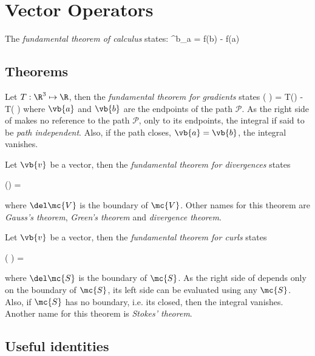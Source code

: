 \documentclass[oneside, 12pt]{book}
\begin{document}
\chapter{Vector Operators} \edef\VectorOperatorsChapter{\thechapter}

The \textit{fundamental theorem of calculus} states:
\beq[eq:ftofcalc]\int^b_a  = f(b) - f(a)\eeq

\section{Theorems}

Let \(T:\R^3 \mapsto \R\), then the \textit{fundamental theorem for gradients} states
\beq[eq:ftforgrads]  \left( \right)\cdot {} = T\left(\right) - T\left( \right)\eeq
where \(\vb{a}\) and \(\vb{b}\) are the endpoints of the path \(\mathcal{P}\). As the right side of  makes no reference to the path \(\mathcal{P}\), only to its endpoints, the integral if said to be \textit{path independent}. Also, if the path closes, \(\vb{a} = \vb{b}\), the integral vanishes.\par 

Let \(\vb{v}\) be a vector, then the \textit{fundamental theorem for divergences} states 

\beq[eq:ftfordivs]  \left(\right) =   \cdot {} \eeq

where \(\del \mc{V}\) is the boundary of \(\mc{V}\). Other names for this theorem are \textit{Gauss's theorem}, \textit{Green's theorem} and \textit{divergence theorem}.\par 

Let \(\vb{v}\) be a vector, then the \textit{fundamental theorem for curls} states

\beq[eq:ftforcurls] \left( \right)\cdot {} = \cdot {} \eeq

where \(\del \mc{S}\) is the boundary of \(\mc{S}\). As the right side of  depends only on the boundary of \(\mc{S}\), its left side can be evaluated using any \(\mc{S}\). Also, if \(\mc{S}\) has no boundary, i.e. its closed, then the integral vanishes. Another name for this theorem is \textit{Stokes' theorem}.\par 

\section{Useful identities}
\end{document}
